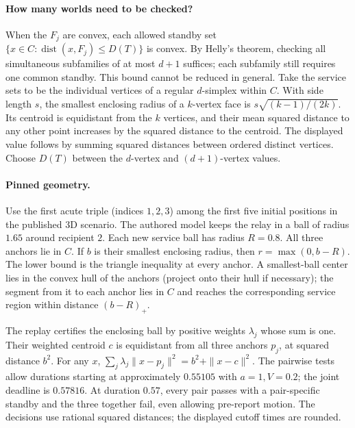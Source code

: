 \documentclass[11pt]{article}
\begin{document}
\paragraph{How many worlds need to be checked?}
When the \(F_j\) are convex, each allowed standby set
\(\{x\in C:\operatorname{dist}(x,F_j)\le D(T)\}\) is convex.
By Helly's theorem, checking all simultaneous subfamilies of at most
\(d+1\) suffices; each subfamily still requires one common standby.
This bound cannot be reduced in general. Take the service sets to be
the individual vertices of a regular \(d\)-simplex within \(C\).
With side length \(s\), the smallest enclosing radius of a
\(k\)-vertex face is \(s\sqrt{(k-1)/(2k)}\). Its centroid is equidistant
from the \(k\) vertices, and their mean squared distance to any other
point increases by the squared distance to the centroid.
The displayed value follows by summing squared distances between
ordered distinct vertices. Choose \(D(T)\) between the
\(d\)-vertex and \((d+1)\)-vertex values.

\paragraph{Pinned geometry.}
Use the first acute triple (indices \(1,2,3\)) among the first five
initial positions in the published 3D scenario. The authored model
keeps the relay in a ball of radius \(1.65\) around recipient \(2\).
Each new service ball has radius \(R=0.8\). All three anchors lie in
\(C\). If \(b\) is their smallest enclosing radius, then
\(r=\max(0,b-R)\). The lower bound is the triangle inequality at every
anchor. A smallest-ball center lies in the convex hull of the anchors
(project onto their hull if necessary); the segment from it to each
anchor lies in \(C\) and reaches the corresponding service region
within distance \((b-R)_+\).

The replay certifies the enclosing ball by positive weights
\(\lambda_j\) whose sum is one. Their weighted centroid \(c\) is
equidistant from all three anchors \(p_j\), at squared distance \(b^2\).
For any \(x\), \(\sum_j\lambda_j\|x-p_j\|^2=b^2+\|x-c\|^2\).
The pairwise tests allow durations starting at approximately \(0.55105\)
with \(a=1,V=0.2\); the joint deadline is \(0.57816\). At duration
\(0.57\), every pair passes with a pair-specific standby and the three
together fail, even allowing pre-report motion. The decisions use
rational squared distances; the displayed cutoff times are rounded.
\end{document}
